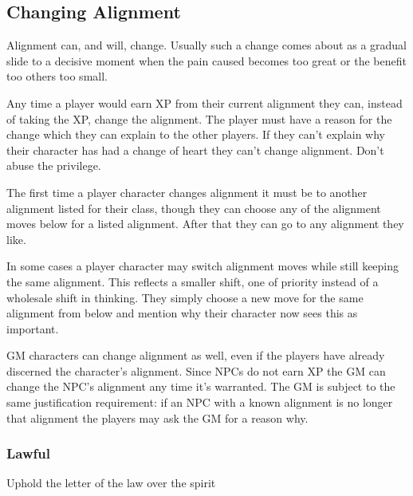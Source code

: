        
\subsection{Changing Alignment}   
       

Alignment can, and will, change. Usually such a change comes about as a gradual slide to a decisive moment when the pain caused becomes too great or the benefit too others too small.

       

Any time a player would earn XP from their current alignment they can, instead of taking the XP, change the alignment. The player must have a reason for the change which they can explain to the other players. If they can't explain why their character has had a change of heart they can't change alignment. Don't abuse the privilege.

       

The first time a player character changes alignment it must be to another alignment listed for their class, though they can choose any of the alignment moves below for a listed alignment. After that they can go to any alignment they like.

       

In some cases a player character may switch alignment moves while still keeping the same alignment. This reflects a smaller shift, one of priority instead of a wholesale shift in thinking. They simply choose a new move for the same alignment from below and mention why their character now sees this as important.

       

GM characters can change alignment as well, even if the players have already discerned the character's alignment. Since NPCs do not earn XP the GM can change the NPC's alignment any time it's warranted. The GM is subject to the same justification requirement: if an NPC with a known alignment is no longer that alignment the players may ask the GM for a reason why.

       
\subsubsection{Lawful}   
       
\startitemize[1,packed]
         
\item Uphold the letter of the law over the spirit


